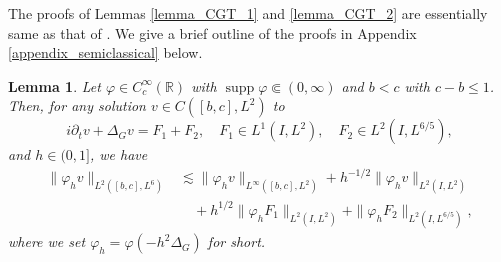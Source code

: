 \documentclass[10pt%
]{amsart}
\numberwithin{equation}{section}
\newcommand{\R}{\mathbb{R}}
\newtheorem{lemma}[theorem]{Lemma}
\theoremstyle{definition}
\begin{document}
The proofs of Lemmas \ref{lemma_CGT_1} and \ref{lemma_CGT_2} are essentially same as that of \cite[Corollary 2.2, Propositions 2.9 and Lemma 3.4]{BGT}. We give a brief outline of the proofs in Appendix \ref{appendix_semiclassical} below. 

\begin{lemma}
	\label{lemma_CGT_3}
	Let $\varphi\in C_c^\infty(\R)$ with $\mathop{\mathrm{supp}} \varphi\Subset (0,\infty)$ and $b<c$ with $c-b\le1$. Then, for any solution  $v\in C([b,c],L^2)$  to 
	$$
	i\partial_tv+\Delta_Gv=F_1+F_2,\quad F_1\in L^1(I,L^2),\quad F_2\in L^2(I,L^{6/5}),
	$$
	and $h\in (0,1]$, we have
	\begin{align*}
		\|\varphi_hv\|_{L^2([b,c],L^6)}
		&\lesssim \|\varphi_h v\|_{L^\infty([b,c],L^2)}+h^{-1/2}\|\varphi_hv\|_{L^2(I,L^2)}\\
		&\quad+h^{1/2}\|\varphi_hF_1\|_{L^2(I,L^2)}+\|\varphi_hF_2\|_{L^2(I,L^{6/5})},
	\end{align*}
	where we set $\varphi_h=\varphi(-h^2\Delta_G)$ for short. 
\end{lemma}
\end{document}
